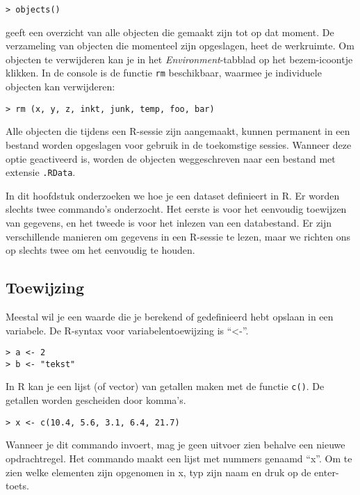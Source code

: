 \begin{lstlisting}
> objects()
\end{lstlisting}

geeft een overzicht van alle objecten die gemaakt zijn tot op dat moment.
De verzameling van objecten die momenteel zijn opgeslagen, heet de werkruimte.
Om objecten te verwijderen kan je in het \textit{Environment}-tabblad op het bezem-icoontje klikken. In de console is de functie \texttt{rm} beschikbaar, waarmee je individuele objecten kan verwijderen:

\begin{lstlisting}
> rm (x, y, z, inkt, junk, temp, foo, bar)
\end{lstlisting}

Alle objecten die tijdens een R-sessie zijn aangemaakt, kunnen permanent in een bestand worden opgeslagen voor gebruik in de toekomstige sessies. Wanneer deze optie geactiveerd is, worden de objecten weggeschreven naar een bestand met extensie \texttt{.RData}.

In dit hoofdstuk onderzoeken we hoe je een dataset definieert in R. Er worden slechts twee commando's onderzocht. Het eerste is voor het eenvoudig toewijzen van gegevens, en het tweede is voor het inlezen van een databestand. Er zijn verschillende manieren om gegevens in een R-sessie te lezen, maar we richten ons op slechts twee om het eenvoudig te houden.

\subsection{Toewijzing}


Meestal wil je een waarde die je berekend of gedefinieerd hebt opslaan in een variabele. De R-syntax voor variabelentoewijzing is ``<-''.

\begin{lstlisting}
> a <- 2
> b <- "tekst"
\end{lstlisting}

In R kan je een lijst (of vector) van getallen maken met de functie \texttt{c()}. De getallen worden gescheiden door komma's.

\begin{lstlisting}
> x <- c(10.4, 5.6, 3.1, 6.4, 21.7)
\end{lstlisting}

Wanneer je dit commando invoert, mag je geen uitvoer zien behalve een nieuwe opdrachtregel. Het commando maakt een lijst met nummers genaamd ``x''. Om te zien welke elementen zijn opgenomen in x, typ zijn naam en druk op de enter-toets.


